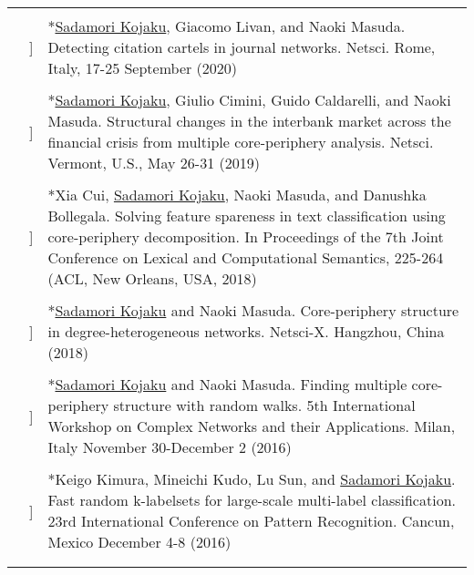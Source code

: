 \documentclass[letterpaper, 11pt]{article}
\newcounter{papercount}
\newcounter{papertype}
\newcommand{\changepapertype}{\setcounter{papercount}{0}\stepcounter{papertype}}
\newcommand{\paperitem}{%
\stepcounter{papercount}%
{\color{OliveGreen}{[\Alph{papertype}\thepapercount}]}
}
\begin{document}
\begin{longtable}{p{1.3in}p{2em}p{5.5in}}
                                                    & & \\
                                                    &\paperitem & *\underline{Sadamori Kojaku}, Giacomo Livan, and Naoki Masuda. Detecting citation cartels in journal networks. Netsci. Rome, Italy, 17-25 September (2020)\\
                                                    & & \\
                                                    &\paperitem & *\underline{Sadamori Kojaku}, Giulio Cimini, Guido Caldarelli, and Naoki Masuda. Structural changes in the interbank market across the financial crisis from multiple core-periphery analysis. Netsci. Vermont, U.S., May 26-31 (2019)\\
                                                    & & \\
                                                    &\paperitem & *Xia Cui, \underline{Sadamori Kojaku}, Naoki Masuda, and Danushka Bollegala. Solving feature spareness in text classification using core-periphery decomposition. In Proceedings of the 7th Joint Conference on Lexical and Computational Semantics, 225-264 (ACL, New Orleans, USA, 2018)\\
                                                    & & \\
                                                    &\paperitem & *\underline{Sadamori Kojaku} and Naoki Masuda. Core-periphery structure in degree-heterogeneous networks. Netsci-X. Hangzhou, China (2018)\\
                                                    & & \\
                                                    &\paperitem & *\underline{Sadamori Kojaku} and Naoki Masuda. Finding multiple core-periphery structure with random walks. 5th International Workshop on Complex Networks and their Applications. Milan, Italy November 30-December 2 (2016)\\
                                                    & & \\
                                                    &\paperitem & *Keigo Kimura, Mineichi Kudo, Lu Sun, and \underline{Sadamori Kojaku}. Fast random k-labelsets for large-scale multi-label classification. 23rd International Conference on Pattern Recognition. Cancun, Mexico December 4-8 (2016)\\
                                                    & & \\
    \changepapertype

\end{longtable}
\end{document}
